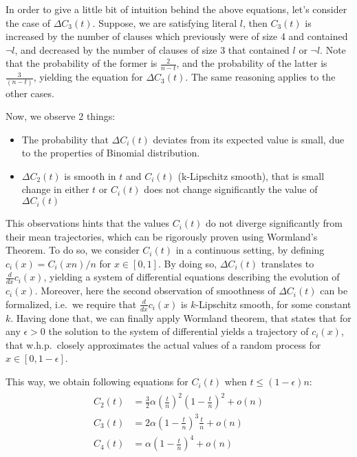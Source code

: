 \documentclass[10pt]{article}
\newcommand{\Not}[1]{$\neg #1$}
\begin{document}
In order to give a little bit of intuition behind the above equations, let's consider the case of $\Delta C_3(t)$. Suppose, we are satisfying literal $l$, then $C_3(t)$ is increased by the number of clauses which previously were of size 4 and contained \Not{l}, and decreased by the number of clauses of size 3 that contained $l$ or \Not{l}. Note that the probability of the former is $\frac{2}{n - t}$, and the probability of the latter is $\frac{3}{(n - t)}$, yielding the equation for $\Delta C_3(t)$. The same reasoning applies to the other cases.
\par
Now, we observe 2 things:
\begin{itemize}
    \item The probability that $\Delta C_i(t)$ deviates from its expected value is small, due to the properties of Binomial distribution.
    \item $\Delta C_2(t)$ is smooth in $t$ and $C_i(t)$ (k-Lipschitz smooth), that is small change in either $t$ or $C_i(t)$ does not change significantly the value of $\Delta C_i(t)$
\end{itemize}
This observations hints that the values $C_i(t)$ do not diverge significantly from their mean trajectories, which can be rigorously proven using Wormland's Theorem. To do so, we consider $C_i(t)$ in a continuous setting, by defining $c_i(x) = C_i(xn) / n$ for $x \in [0, 1] $. By doing so, $\Delta C_i(t)$ translates to $\frac{d}{dx} c_i(x)$, yielding a system of differential equations describing the evolution of $c_i(x)$. Moreover, here the second observation of smoothness of $\Delta C_i(t)$ can be formalized, i.e.\ we require that $\frac{d}{dx} c_i(x)$ is $k$-Lipschitz smooth, for some constant $k$. Having done that, we can finally apply Wormland theorem, that states that for any $\epsilon > 0$ the solution to the system of differential yields a trajectory of $c_i(x)$, that w.h.p.\  closely approximates the actual values of a random process for $x \in [0, 1 - \epsilon]$.
\par
This way, we obtain following equations for $C_i(t)$ when $t \leq (1- \epsilon)n$:
\begin{align}
\begin{split}
    C_2(t) &= \frac{3}{2} \alpha {(\frac{t}{n})}^2{(1 - \frac{t}{n})}^2 + o(n)
    \\
    C_3(t) &= 2 \alpha {(1 - \frac{t}{n})}^3 \frac{t}{n} + o(n)
    \\
    C_4(t) &= \alpha {(1 - \frac{t}{n})}^4 + o(n)
\end{split}
\end{align}
\end{document}
